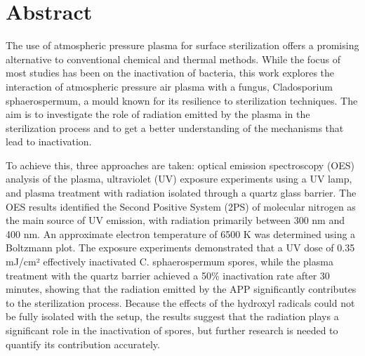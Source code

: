 \chapter*{Abstract}
The use of atmospheric pressure plasma for surface sterilization offers a promising alternative to conventional chemical and thermal methods. While the focus of most studies has been on the inactivation of bacteria, this work explores the interaction of atmospheric pressure air plasma with a fungus, Cladosporium sphaerospermum, a mould known for its resilience to sterilization techniques. The aim is to investigate the role of radiation emitted by the plasma in the sterilization process and to get a better understanding of the mechanisms that lead to inactivation.

To achieve this, three approaches are taken: optical emission spectroscopy (OES) analysis of the plasma, ultraviolet (UV) exposure experiments using a UV lamp, and plasma treatment with radiation isolated through a quartz glass barrier. The OES results identified the Second Positive System (2PS) of molecular nitrogen as the main source of UV emission, with radiation primarily between 300 nm and 400 nm. An approximate electron temperature of 6500 K was determined using a Boltzmann plot. The exposure experiments demonstrated that a UV dose of 0.35 mJ/cm² effectively inactivated C. sphaerospermum spores, while the plasma treatment with the quartz barrier achieved a 50\% inactivation rate after 30 minutes, showing that the radiation emitted by the APP significantly contributes to the sterilization process. Because the effects of the hydroxyl radicals could not be fully isolated with the setup, the results suggest that the radiation plays a significant role in the inactivation of spores, but further research is needed to quantify its contribution accurately.